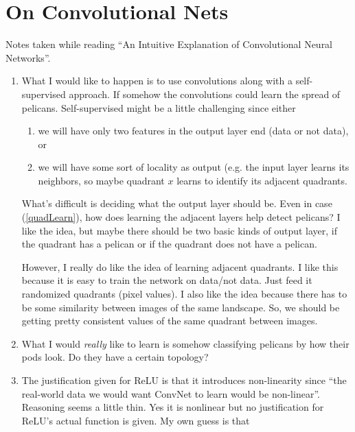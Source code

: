 \chapter{On Convolutional Nets}

Notes taken while reading ``An Intuitive Explanation of Convolutional Neural
Networks''\cite{intuitiveCNN}.

\begin{enumerate}
	\item What I would like to happen is to use convolutions along with a
	self-supervised approach. If somehow the convolutions could learn the
	spread of pelicans. Self-supervised might be a little challenging since
	either
	\begin{enumerate}
		\item we will have only two features in the output layer end
		(data or not data), or 
		\item \label{quadLearn} we will have some sort of locality as
		output (e.g. the input layer learns its neighbors, so maybe
		quadrant $x$ learns to identify its adjacent quadrants.
	\end{enumerate}
	What's difficult is deciding what the output layer should be. Even in
	case (\ref{quadLearn}), how does learning the adjacent layers help
	detect pelicans? I like the idea, but maybe there should be two basic
	kinds of output layer, if the quadrant has a pelican or if the quadrant
	does not have a pelican.

	However, I really do like the idea of  learning adjacent quadrants. I
	like this because it is easy to train the network on data/not data.
	Just feed it randomized quadrants (pixel values). I also like the idea
	because there has to be some similarity between images of the same
	landscape. So, we should be getting pretty consistent values of the
	same quadrant between images.

	\item What I would \emph{really} like to learn is somehow classifying
	pelicans by how their pods look. Do they have a certain topology?

	\item The justification given for ReLU is that it introduces
	non-linearity since ``the real-world data we would want ConvNet to
	learn would be non-linear''. Reasoning seems a little thin. Yes it is
	nonlinear but no justification for ReLU's actual function is given. My
		own guess is that 
\end{enumerate}
